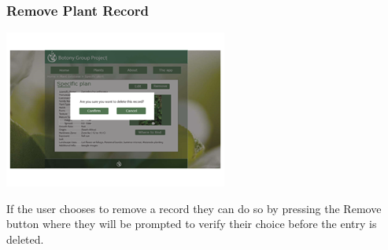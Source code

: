 		\subsubsection{Remove Plant Record}
			\begin{center}
				\includegraphics[scale=1]{uiDesign/botanyWebPlantRemoval.png}
			\end{center}
			If the user chooses to remove a record they can do so by pressing the Remove button where they will be prompted to verify their choice before the entry is deleted.
